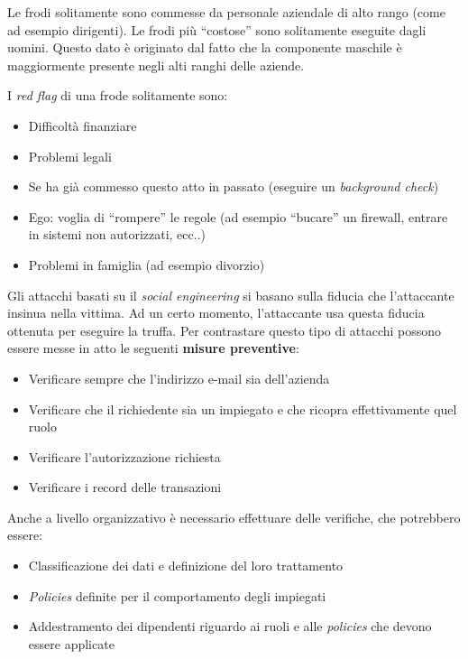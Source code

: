 \begin{Answer} [
  ref={fr7},
  number={7}
 ]
 \Question Le frodi solitamente sono commesse da personale aziendale di alto 
rango (come ad esempio dirigenti). Le frodi pi\`u ``costose'' sono solitamente 
eseguite dagli uomini. Questo dato \`e originato dal fatto che la componente 
maschile \`e maggiormente presente negli alti ranghi delle aziende.

 \Question I \textit{red flag} di una frode solitamente sono:
 \begin{itemize}
  \item Difficoltà finanziare
  \item Problemi legali
  \item Se ha già commesso questo atto in passato (eseguire un
  \textit{background check})
  \item Ego: voglia di ``rompere'' le regole (ad esempio ``bucare'' un
  firewall, entrare in sistemi non autorizzati, ecc..)
  \item Problemi in famiglia (ad esempio divorzio)
\end{itemize}

 \Question Gli attacchi basati su il \textit{social engineering} si basano 
sulla fiducia che l'attaccante insinua nella vittima. Ad un certo momento, 
l'attaccante usa questa fiducia ottenuta per eseguire la truffa.
Per contrastare questo tipo di attacchi possono essere messe in atto 
le seguenti \textbf{misure preventive}:
\begin{itemize}
  \item Verificare sempre che l'indirizzo e-mail sia dell'azienda
  \item Verificare che il richiedente sia un impiegato e che ricopra
  effettivamente quel ruolo
  \item Verificare l'autorizzazione richiesta
  \item Verificare i record delle transazioni
\end{itemize}

Anche a livello organizzativo è necessario effettuare delle verifiche, che
potrebbero essere:
\begin{itemize}
  \item Classificazione dei dati e definizione del loro trattamento
  \item \textit{Policies} definite per il comportamento degli impiegati
  \item Addestramento dei dipendenti riguardo ai ruoli e alle \textit{policies}
che devono essere applicate
\end{itemize}



\end{Answer}
